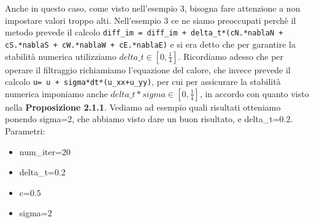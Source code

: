 Anche in questo caso, come visto nell'esempio 3, bisogna fare attenzione a non impostare valori troppo alti. Nell'esempio 3 ce ne siamo preoccupati perchè il metodo prevede il calcolo \texttt{diff\_im = diff\_im + delta\_t*(cN.*nablaN + cS.*nablaS + cW.*nablaW + cE.*nablaE)} e si era detto che per garantire la stabilità numerica utilizziamo $delta\_t \in [0,\frac{1}{4}]$.
Ricordiamo adesso che per operare il filtraggio richiamiamo l'equazione del calore, che invece prevede il calcolo \texttt{u= u + sigma*dt*(u\_{xx}+u\_{yy})}, per cui per assicurare la stabilità numerica imponiamo anche $delta\_t*sigma \in[0,\frac{1}{4}]$, in accordo con quanto visto nella \textbf{Proposizione 2.1.1}. Vediamo ad esempio quali risultati otteniamo ponendo sigma=2, che abbiamo visto dare un buon risultato, e delta\_t=0.2.\\
Parametri:
\begin{itemize}
    \item num\_iter=20
    \item delta\_t=0.2
    \item c=0.5
    \item sigma=2
\end{itemize}

